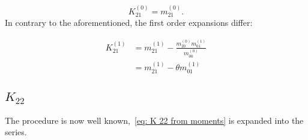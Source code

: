 \begin{equation}
  K_{21}^{(0)} = m_{21}^{(0)}.
\end{equation}
In contrary to the aforementioned, the first order expansions differ:

\begin{equation}
  \begin{aligned}
    K_{21}^{(1)} & = m_{21}^{(1)}
    - \frac{m_{20}^{(0)} m_{01}^{(1)}}{m_{00}^{(0)}}
    \\ &
    = m_{21}^{(1)} - \theta m_{01}^{(1)}
  \end{aligned}
\end{equation}

\subsection{\texorpdfstring{$K_{22}$}{K 22}}
\label{sub: K 22}
The procedure is now well known,~\eqref{eq: K 22 from moments} is expanded into the series.

